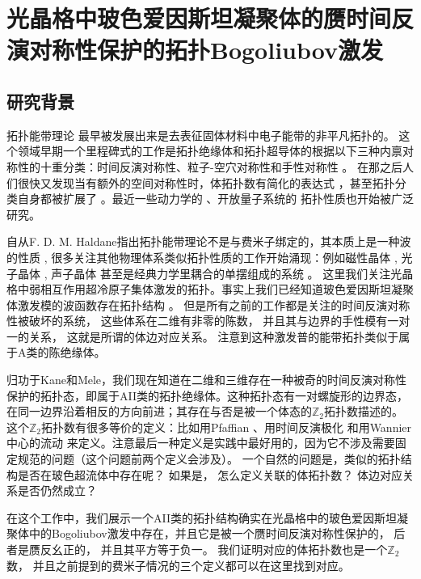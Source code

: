 
\chapter{光晶格中玻色爱因斯坦凝聚体的赝时间反演对称性保护的拓扑Bogoliubov激发}

\section{研究背景}
拓扑能带理论 \cite{Qi2011,Hasan2010,Chiu2016} 最早被发展出来是去表征固体材料中电子能带的非平凡拓扑的。 这个领域早期一个里程碑式的工作是拓扑绝缘体和拓扑超导体的根据以下三种内禀对称性的十重分类：时间反演对称性、粒子-空穴对称性和手性对称性 \cite{Altland1997,Zirnbauer2018}。 在那之后人们很快又发现当有额外的空间对称性时，体拓扑数有简化的表达式 \cite{Fu2007}，甚至拓扑分类自身都被扩展了 \cite{Fu2011}。最近一些动力学的 \cite{Chang2018,Yang2018,Gong2018,Qiu2018}、开放量子系统的 \cite{Shen2018,Kawabata2018,Yao2018,Kawabata2019} 拓扑性质也开始被广泛研究。

自从F. D. M. Haldane指出拓扑能带理论不是与费米子绑定的，其本质上是一种波的性质 \cite{Raghu2008}, 很多关注其他物理体系类似拓扑性质的工作开始涌现：例如磁性晶体 \cite{Shindou2013,Chisnell2015,Kondo2019}, 光子晶体 \cite{Wang2008,Rechtsman2013,Peano2016}, 声子晶体 \cite{Fleury2014,SafaviNaeini2014,Peano2015} 甚至是经典力学里耦合的单摆组成的系统 \cite{Suesstrunk2015}。
这里我们关注光晶格中弱相互作用超冷原子集体激发的拓扑。事实上我们已经知道玻色爱因斯坦凝聚体激发模的波函数存在拓扑结构 \cite{Furukawa2015,Xu2016,Liberto2016}。
但是所有之前的工作都是关注的时间反演对称性被破坏的系统，
这些体系在二维有非零的陈数，
并且其与边界的手性模有一对一的关系，
这就是所谓的体边对应关系。
注意到这种激发普的能带拓扑类似于属于A类的陈绝缘体。

归功于Kane和Mele，我们现在知道在二维和三维存在一种被奇的时间反演对称性保护的拓扑态，即属于AII类的拓扑绝缘体。这种拓扑态有一对螺旋形的边界态，在同一边界沿着相反的方向前进；其存在与否是被一个体态的$\mathbb Z_2$拓扑数描述的。这个$\mathbb Z_2$拓扑数有很多等价的定义：比如用Pfaffian \cite{Kane2005}、用时间反演极化 \cite{Fu2006} 和用Wannier中心的流动 \cite{Yu2011} 来定义。注意最后一种定义是实践中最好用的，因为它不涉及需要固定规范的问题（这个问题前两个定义会涉及）。
一个自然的问题是，类似的拓扑结构是否在玻色超流体中存在呢？
如果是，
怎么定义关联的体拓扑数？
体边对应关系是否仍然成立？

在这个工作中，我们展示一个AII类的拓扑结构确实在光晶格中的玻色爱因斯坦凝聚体中的Bogoliubov激发中存在，并且它是被一个赝时间反演对称性保护的，
后者是赝反幺正的，
并且其平方等于负一。
我们证明对应的体拓扑数也是一个$\mathbb Z_2$数，
并且之前提到的费米子情况的三个定义都可以在这里找到对应。

